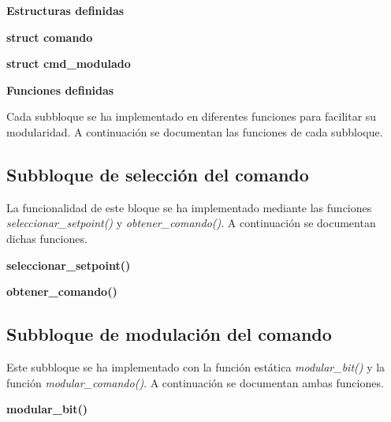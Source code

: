 

\noindent\Large\textbf{Estructuras definidas}\label{comandos:estructuras}

\normalsize\textbf{struct comando}\label{comandos:comando}



\normalsize\textbf{struct cmd\_modulado}\label{comandos:cmdModulado}



\noindent\Large\textbf{Funciones definidas}\label{comandos:funciones}

\normalsize Cada subbloque se ha implementado en diferentes funciones para facilitar su modularidad. A continuación se documentan las funciones de cada subbloque.

\subsection{Subbloque de selección del comando}\label{comandos:seleccion}

	La funcionalidad de este bloque se ha implementado mediante las funciones \textit{seleccionar\_setpoint()} y \textit{obtener\_comando()}. A continuación se documentan dichas funciones.

\normalsize\textbf{seleccionar\_setpoint()}\label{seleccion:setpoint}


\normalsize\textbf{obtener\_comando()}\label{seleccion:obtenerComando}


\subsection{Subbloque de modulación del comando}\label{comandos:modulacion}

Este subbloque se ha implementado con la función estática \textit{modular\_bit()} y la función \textit{modular\_comando()}. A continuación se documentan ambas funciones.

\normalsize\textbf{modular\_bit()}\label{modulacion:bit}


